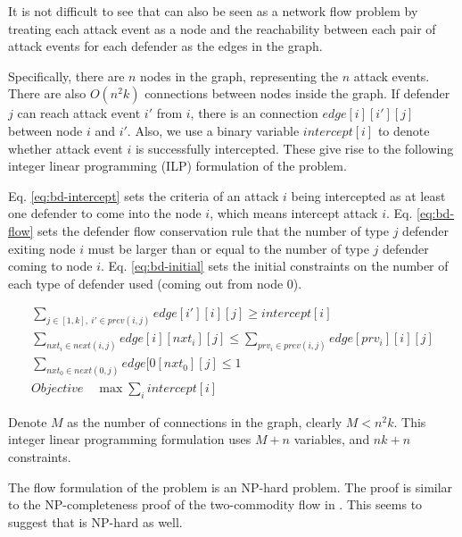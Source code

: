 It is not difficult to see that \prob can also be seen as a network flow problem by treating each attack event as a node and the reachability between each pair of attack events for each defender as the edges in the graph. 

Specifically, there are $n$ nodes in the graph, representing the $n$ attack events. 
There are also $O(n^2k)$ connections between nodes inside the graph.
If defender $j$ can reach attack event $i'$ from $i$, there is an connection 
$edge[i][i'][j]$ between node $i$ and $i'$. 
Also, we use a binary variable $intercept[i]$ to denote whether attack event $i$ is successfully intercepted. 
These give rise to the following integer linear programming (ILP) formulation of the problem.

Eq. \eqref{eq:bd-intercept} sets the criteria of an attack $i$ being intercepted as at least one defender to come into the node $i$, which means intercept attack $i$.
Eq. \eqref{eq:bd-flow} sets the defender flow conservation rule that the number of type $j$ defender exiting node $i$ must be larger than or equal to the number of type $j$ defender coming to node $i$.
Eq. \eqref{eq:bd-initial} sets the initial constraints on the number of each type of defender used (coming out from node 0).

\begin{gather}
\sum_{j\in[1, k],\ i'\in prev(i, j)} edge[i'][i][j] \geq intercept[i] \label{eq:bd-intercept}\\
\sum_{nxt_i\in next(i, j)} edge[i][nxt_i][j] \leq \sum_{prv_i \in prev(i,j)} edge[prv_i][i][j]  \label{eq:bd-flow} \\
\sum_{nxt_0 \in next(0, j)} edge[0[nxt_0][j] \leq 1 \label{eq:bd-initial}  \\
Objective\quad \max \sum_i intercept[i]
\end{gather}

Denote $M$ as the number of connections in the graph, clearly $M<n^2k$.
This integer linear programming formulation uses $M + n$ variables, and 
$nk + n$ constraints. 

\begin{remark}
The flow formulation of the problem is an NP-hard problem. The proof is similar to the NP-completeness proof of the two-commodity flow in \cite{even1975complexity}. This seems to suggest that \prob is NP-hard as well. 
\end{remark}

